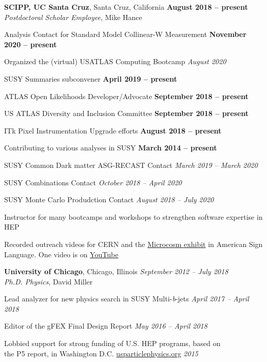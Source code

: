 \documentclass[margin,line]{resume}
\begin{document}
\begin{resume}
\textbf{SCIPP, UC Santa Cruz}, Santa Cruz, California \hfill \textbf{August 2018 -- present}\\
\textsl{Postdoctoral Scholar Employee}, Mike Hance
\begin{list2}
  \item Analysis Contact for Standard Model Collinear-W Measurement \hfill \textbf{November 2020 -- present}
  \item Organized the (virtual) USATLAS Computing Bootcamp \hfill \textsl{August 2020}
  \item SUSY Summaries subconvener \hfill \textbf{April 2019 -- present}
  \item ATLAS Open Likelihoods Developer/Advocate \hfill \textbf{September 2018 -- present}
  \item US ATLAS Diversity and Inclusion Committee \hfill \textbf{September 2018 -- present}
  \item ITk Pixel Instrumentation Upgrade efforts \hfill \textbf{August 2018 -- present}
  \item Contributing to various analyses in SUSY \hfill \textbf{March 2014 -- present}
  \item SUSY Common Dark matter ASG-RECAST Contact \hfill \textsl{March 2019 -- March 2020}
  \item SUSY Combinations Contact \hfill \textsl{October 2018 -- April 2020}
  \item SUSY Monte Carlo Produdction Contact \hfill \textsl{August 2018 -- July 2020}
  \item Instructor for many bootcamps and workshops to strengthen software expertise in HEP
  \item Recorded outreach videos for CERN and the \href{https://microcosm.web.cern.ch/en}{Microcosm exhibit} in American Sign Language. One video is on \href{https://www.youtube.com/watch?v=BaGjAruqFec}{YouTube}
\end{list2}
%
\textbf{University of Chicago}, Chicago, Illinois \hfill \textsl{September 2012 -- July 2018}\\
\textsl{Ph.D. Physics}, David Miller
\begin{list2}
  \item Lead analyzer for new physics search in SUSY Multi-\textsl{b}-jets \hfill \textsl{April 2017 -- April 2018}
  \item Editor of the gFEX Final Design Report \hfill \textsl{May 2016 -- April 2018}
  \item Lobbied support for strong funding of U.S. HEP programs, based on\\ the P5 report, in Washington D.C. \href{https://www.usparticlephysics.org/strategy.html}{usparticlephysics.org} \hfill \textsl{2015}

\end{list2}
\end{resume}
\end{document}

